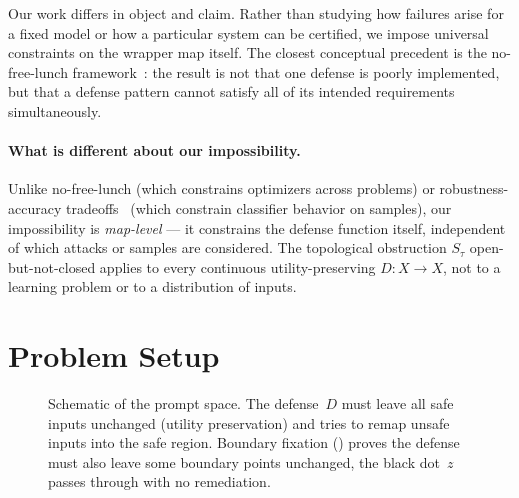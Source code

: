 \documentclass[11pt]{article}
\begin{document}
Our work differs in object and claim. Rather than studying how failures
arise for a fixed model or how a particular system can be certified, we
impose universal constraints on the wrapper map itself. The closest
conceptual precedent is the no-free-lunch
framework~\cite{wolpert1997no}: the result is not that one defense is
poorly implemented, but that a defense pattern cannot satisfy all of
its intended requirements simultaneously.

\paragraph{What is different about our impossibility.}
Unlike no-free-lunch (which constrains optimizers across problems) or
robustness-accuracy tradeoffs~\cite{tsipras2018robustness} (which
constrain classifier behavior on samples), our impossibility is
\emph{map-level} --- it constrains the defense function itself,
independent of which attacks or samples are considered. The
topological obstruction $S_\tau$ open-but-not-closed applies to every
continuous utility-preserving $D\colon X \to X$, not to a learning
problem or to a distribution of inputs.


\section{Problem Setup}
\label{sec:setup}

\begin{figure}[t]
\centering
{}
\caption{Schematic of the prompt space. The defense~$D$ must leave all
safe inputs unchanged (utility preservation) and tries to remap unsafe
inputs into the safe region. Boundary fixation () proves
the defense must also leave some boundary points unchanged, the black
dot~$z$ passes through with no remediation.}
\label{fig:landscape}
\end{figure}
\end{document}
